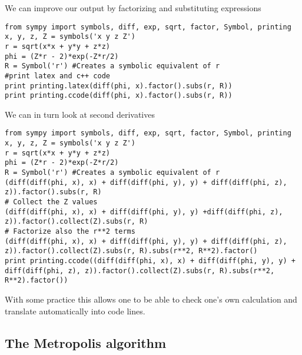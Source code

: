 \documentclass[%
oneside,                 %
final,                   %
10pt]{article}
\begin{document}
We can improve our output by factorizing and substituting expressions









\begin{verbatim}
from sympy import symbols, diff, exp, sqrt, factor, Symbol, printing
x, y, z, Z = symbols('x y z Z')
r = sqrt(x*x + y*y + z*z)
phi = (Z*r - 2)*exp(-Z*r/2)
R = Symbol('r') #Creates a symbolic equivalent of r
#print latex and c++ code
print printing.latex(diff(phi, x).factor().subs(r, R))
print printing.ccode(diff(phi, x).factor().subs(r, R))

\end{verbatim}


We can in turn look at second derivatives












\begin{verbatim}
from sympy import symbols, diff, exp, sqrt, factor, Symbol, printing
x, y, z, Z = symbols('x y z Z')
r = sqrt(x*x + y*y + z*z)
phi = (Z*r - 2)*exp(-Z*r/2)
R = Symbol('r') #Creates a symbolic equivalent of r
(diff(diff(phi, x), x) + diff(diff(phi, y), y) + diff(diff(phi, z), z)).factor().subs(r, R)
# Collect the Z values
(diff(diff(phi, x), x) + diff(diff(phi, y), y) +diff(diff(phi, z), z)).factor().collect(Z).subs(r, R)
# Factorize also the r**2 terms
(diff(diff(phi, x), x) + diff(diff(phi, y), y) + diff(diff(phi, z), z)).factor().collect(Z).subs(r, R).subs(r**2, R**2).factor()
print printing.ccode((diff(diff(phi, x), x) + diff(diff(phi, y), y) + diff(diff(phi, z), z)).factor().collect(Z).subs(r, R).subs(r**2, R**2).factor())

\end{verbatim}

With some practice this allows one to be able to check one's own calculation and translate automatically into code lines.

\subsection*{The Metropolis algorithm}
\end{document}
